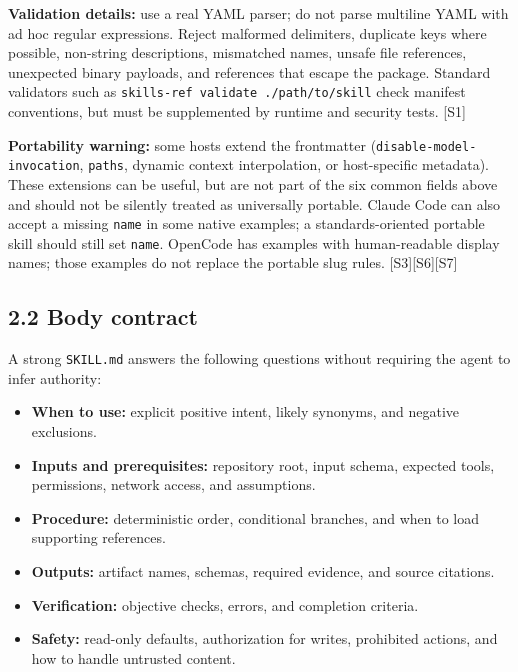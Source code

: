 \documentclass[
  10pt,
  letterpaper,
]{article}
\newcommand{\passthrough}[1]{#1}
\providecommand{\tightlist}{%
  \setlength{\itemsep}{0pt}\setlength{\parskip}{0pt}}
\begin{document}
\textbf{Validation details:} use a real YAML parser; do not parse
multiline YAML with ad hoc regular expressions. Reject malformed
delimiters, duplicate keys where possible, non-string descriptions,
mismatched names, unsafe file references, unexpected binary payloads,
and references that escape the package. Standard validators such as
\passthrough{\lstinline!skills-ref validate ./path/to/skill!} check
manifest conventions, but must be supplemented by runtime and security
tests. {[}S1{]}

\textbf{Portability warning:} some hosts extend the frontmatter
(\passthrough{\lstinline!disable-model-invocation!},
\passthrough{\lstinline!paths!}, dynamic context interpolation, or
host-specific metadata). These extensions can be useful, but are not
part of the six common fields above and should not be silently treated
as universally portable. Claude Code can also accept a missing
\passthrough{\lstinline!name!} in some native examples; a
standards-oriented portable skill should still set
\passthrough{\lstinline!name!}. OpenCode has examples with
human-readable display names; those examples do not replace the portable
slug rules. {[}S3{]}{[}S6{]}{[}S7{]}

\subsection{2.2 Body contract}\label{body-contract}

A strong \passthrough{\lstinline!SKILL.md!} answers the following
questions without requiring the agent to infer authority:

\begin{itemize}
\tightlist
\item
  \textbf{When to use:} explicit positive intent, likely synonyms, and
  negative exclusions.
\item
  \textbf{Inputs and prerequisites:} repository root, input schema,
  expected tools, permissions, network access, and assumptions.
\item
  \textbf{Procedure:} deterministic order, conditional branches, and
  when to load supporting references.
\item
  \textbf{Outputs:} artifact names, schemas, required evidence, and
  source citations.
\item
  \textbf{Verification:} objective checks, errors, and completion
  criteria.
\item
  \textbf{Safety:} read-only defaults, authorization for writes,
  prohibited actions, and how to handle untrusted content.
\end{itemize}
\end{document}
